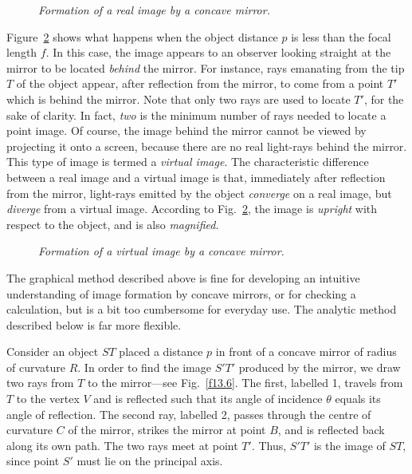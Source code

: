 \begin{figure}
\epsfysize=3.5in
\centerline{}
\caption{\em Formation of a real image by a concave mirror.}\label{f13.4}
\end{figure}

Figure~\ref{f13.5} shows what happens when the object distance $p$
is less than the focal length $f$. In this case, the image 
 appears to an observer looking straight
at the mirror to be located {\em behind}\/ the mirror.
For instance, rays emanating from the tip $T$ of the object
appear, after reflection from the
mirror, to come from a point $T'$  which is behind the
mirror.  Note that only two rays are used to locate $T'$, for
the sake of clarity. In fact, {\em two}\/ is the minimum number of rays
needed to locate a point image. 
Of course,
the image behind the mirror
cannot be viewed by projecting it onto a screen, because
there are no real light-rays behind the mirror. This
type of image is termed a {\em virtual image}. The characteristic
difference
between a real image and a virtual image is that, immediately after 
reflection from the mirror, light-rays emitted by the object {\em converge}\/
on a real image, but {\em diverge}\/ from a virtual image. 
According to Fig.~\ref{f13.5}, the image is {\em upright}\/ with
respect to the object, and is also {\em magnified}.

\begin{figure}
\epsfysize=3in
\centerline{}
\caption{\em Formation of a virtual image by a concave mirror.}\label{f13.5}
\end{figure}

The graphical method described above is fine for developing an
intuitive understanding of image formation by concave mirrors,
 or for 
checking a calculation, but is a bit  too cumbersome for
everyday use. The analytic method described below is far more
flexible.

Consider an object $ST$ placed a distance $p$ in front of
a concave mirror of radius of curvature $R$. In order to find
the image $S'T'$ produced by the mirror, we draw two rays from
$T$ to the mirror---see Fig.~\ref{f13.6}. The first, labelled 1, travels from $T$ to the
vertex $V$ and is reflected such that its angle of
incidence $\theta$ equals its angle of reflection. The second
ray, labelled 2, passes through the centre of curvature $C$ of
the mirror, strikes the mirror at point $B$, and is reflected
back along its own path. The two rays meet at point $T'$.
Thus, $S'T'$ is the image of $ST$, since point $S'$ must lie on the
principal axis.

